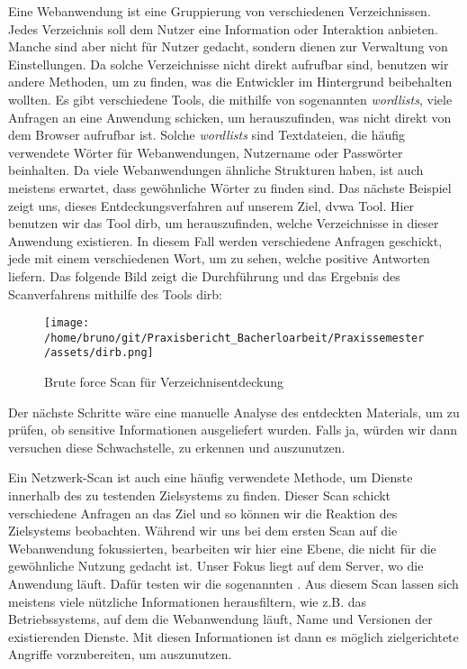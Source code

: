 Eine Webanwendung ist eine Gruppierung von verschiedenen Verzeichnissen. Jedes Verzeichnis soll dem Nutzer eine Information oder Interaktion anbieten. Manche sind aber nicht für Nutzer gedacht, sondern dienen zur Verwaltung von Einstellungen. Da solche Verzeichnisse nicht direkt aufrufbar sind, benutzen wir andere Methoden, um zu finden, was die Entwickler im Hintergrund beibehalten wollten. Es gibt verschiedene Tools, die mithilfe von sogenannten \textit{wordlists}, viele Anfragen an eine Anwendung schicken, um herauszufinden, was nicht direkt von dem Browser aufrufbar ist. Solche \textit{wordlists} sind Textdateien, die häufig verwendete Wörter für Webanwendungen, Nutzername oder Passwörter beinhalten. Da viele Webanwendungen ähnliche Strukturen haben, ist auch meistens erwartet, dass gewöhnliche Wörter zu finden sind. Das nächste Beispiel zeigt uns, dieses Entdeckungsverfahren auf unserem Ziel, \gls{dvwa} Tool. Hier benutzen wir das Tool \gls{dirb}, um herauszufinden, welche Verzeichnisse in dieser Anwendung existieren. In diesem Fall werden verschiedene Anfragen geschickt, jede mit einem verschiedenen Wort, um zu sehen, welche positive Antworten liefern. Das folgende Bild zeigt die Durchführung und das Ergebnis des Scanverfahrens mithilfe des Tools \gls{dirb}:

\begin{figure}[H]
    \centering
    \texttt{[image: /home/bruno/git/Praxisbericht\_Bacherloarbeit/Praxissemester/assets/dirb.png]}
    \caption{Brute force Scan für Verzeichnisentdeckung}
    \centering
\end{figure}

Der nächste Schritte wäre eine manuelle Analyse des entdeckten Materials, um zu prüfen, ob sensitive Informationen ausgeliefert wurden. Falls ja, würden wir dann versuchen diese \gls{Schwachstelle}, zu erkennen und auszunutzen.

Ein Netzwerk-Scan ist auch eine häufig verwendete Methode, um Dienste innerhalb des zu testenden Zielsystems zu finden. Dieser Scan schickt verschiedene Anfragen an das Ziel und so können wir die Reaktion des Zielsystems beobachten. Während wir uns bei dem ersten Scan auf die Webanwendung fokussierten, bearbeiten wir hier eine Ebene, die nicht für die gewöhnliche Nutzung gedacht ist. Unser Fokus liegt auf dem Server, wo die Anwendung läuft. Dafür testen wir die sogenannten . Aus diesem Scan lassen sich meistens viele nützliche Informationen herausfiltern, wie z.B. das Betriebssystems, auf dem die Webanwendung läuft, Name und Versionen der existierenden Dienste. Mit diesen Informationen ist dann es möglich zielgerichtete Angriffe vorzubereiten, um  auszunutzen.

